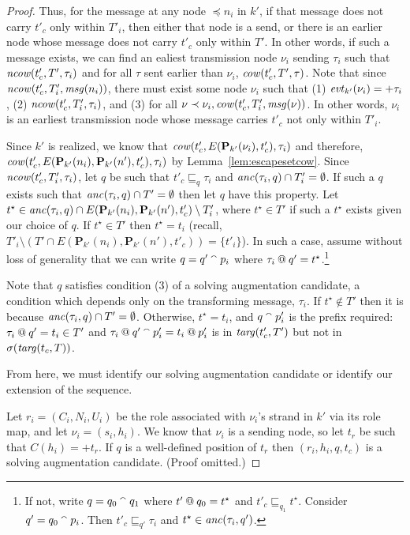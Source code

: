 \documentclass[12pt]{article}
\theoremstyle{definition}
\newcommand{\concat}{\append}
\newcommand{\pubmsg}{\mathbf{P}}
\newcommand{\anc}{\fn{anc}}
\newcommand{\mcow}{\fn{cow}}
\newcommand{\mncow}{\fn{ncow}}
\newcommand{\evt}{\fn{evt}}
\newcommand{\msg}{\fn{msg}}
\begin{document}
\begin{proof}
Thus, for the message at any node $\preceq n_i$ in $k'$, if that message does not carry $t'_c$ only within $T'_i$, then
either that node is a send, or there is an earlier node whose message does not carry $t'_c$ only within $T'$.  In other
words, if such a message exists, we can find an ealiest transmission node $\nu_i$ sending $\tau_i$ such that $\mncow(t'_c, T',
\tau_i)$ and for all $\tau$ sent earlier than $\nu_i$, $\mcow(t'_c, T', \tau)$.  Note that since $\mncow(t'_c, T'_i,
\msg(n_i))$, there must exist some node $\nu_i$ such that (1) $\evt_{k'}(\nu_i) = +\tau_i$, (2) $\mncow(t'_c, T'_i, \tau_i)$, and
(3) for all $\nu \prec \nu_i, \mcow(t'_c, T'_i, \msg(\nu))$.  In other words, $\nu_i$ is an earliest transmission node whose
message carries $t'_c$ not only within $T'_i$.

Since $k'$ is realized, we know that $\mcow(t'_c,E(\pubmsg_{k'}(\nu_i),t'_c),\tau_i)$ and therefore,
$\mcow(t'_c,E(\pubmsg_{k'}(n_i),\pubmsg_{k'}(n'),t'_c),\tau_i)$ by Lemma~\ref{lem:escapesetcow}.  Since $\mncow(t'_c,T'_i,\tau_i)$,
let $q$ be such that $t'_c \sqsubseteq_q \tau_i$ and $\anc(\tau_i, q) \cap T'_i = \emptyset$.  If such a $q$ exists such that
$\anc(\tau_i, q) \cap T' = \emptyset$ then let $q$ have this property.  Let $t^\star \in \anc(\tau_i,q) \cap E(\pubmsg_{k'}(n_i),
\pubmsg_{k'}(n'),t'_c)\setminus T'_i$, where $t^\star \in T'$ if such a $t^\star$ exists given our choice of $q$.
If $t^\star \in T'$ then $t^\star = t_i$ (recall, $T'_i \setminus (T' \cap E(\pubmsg_{k'}(n_i),\pubmsg_{k'}(n'),t'_c)) = \{t'_i\}$).
In such a case, assume without loss of generality that we can write $q = q' \concat p_i$ where $\tau_i \mathbin{@} q' =
t^\star$.\footnote{If not, write $q = q_0 \mathbin{{}^\smallfrown} q_1$ where $t' \mathbin{@} q_0 = t^\star$ and
$t'_c \sqsubseteq_{q_1} t^\star$.  Consider $q' = q_0 \mathbin{{}^\smallfrown} p_i$.  Then $t'_c \sqsubseteq_{q'} \tau_i$ and $t^\star \in
\anc(\tau_i,q')$.}

Note that $q$ satisfies condition (3) of a solving augmentation candidate, a condition which depends only on the transforming
message, $\tau_i$.  If $t^\star \notin T'$ then it is because $\anc(\tau_i, q) \cap T' = \emptyset$.  Otherwise, $t^\star = t_i$,
and $q \concat p'_i$ is the prefix required: $\tau_i \mathbin{@} q' = t_i \in T'$ and $\tau_i \termat q' \concat p'_i = t_i \termat p'_i$
is in $\operatorname{\mathit{targ}}(t'_c,T')$ but not in $\sigma(\operatorname{\mathit{targ}}(t_c,T))$.

From here, we must identify our solving augmentation candidate or identify our extension of the sequence.

Let $r_i = (C_i,N_i,U_i)$ be the role associated with $\nu_i$'s strand in $k'$ via its role map, and let $\nu_i = (s_i, h_i)$.
We know that $\nu_i$ is a sending node, so let $t_r$ be such that $C(h_i) = +t_r$.  If $q$ is a well-defined position of
$t_r$ then $(r_i,h_i,q,t_c)$ is a solving augmentation candidate.  (Proof omitted.)


\end{proof}
\end{document}
